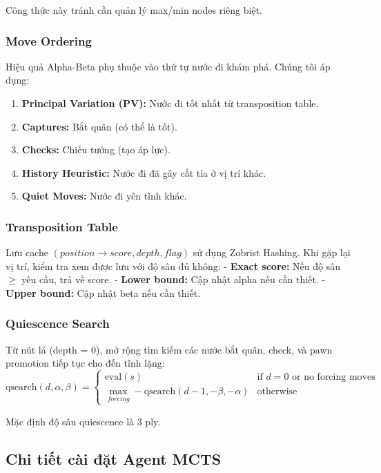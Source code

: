 Công thức này tránh cần quản lý max/min nodes riêng biệt.

\subsubsection{Move Ordering}
Hiệu quả Alpha-Beta phụ thuộc vào thứ tự nước đi khám phá. Chúng tôi áp dụng:
\begin{enumerate}
    \item \textbf{Principal Variation (PV):} Nước đi tốt nhất từ transposition table.
    \item \textbf{Captures:} Bắt quân (có thể là tốt).
    \item \textbf{Checks:} Chiếu tướng (tạo áp lực).
    \item \textbf{History Heuristic:} Nước đi đã gây cắt tỉa ở vị trí khác.
    \item \textbf{Quiet Moves:} Nước đi yên tĩnh khác.
\end{enumerate}

\subsubsection{Transposition Table}
Lưu cache $(position \to score, depth, flag)$ sử dụng Zobrist Hashing. Khi gặp lại vị trí, kiểm tra xem được lưu với độ sâu đủ không:
- \textbf{Exact score:} Nếu độ sâu $\geq$ yêu cầu, trả về score.
- \textbf{Lower bound:} Cập nhật alpha nếu cần thiết.
- \textbf{Upper bound:} Cập nhật beta nếu cần thiết.

\subsubsection{Quiescence Search}
Từ nút lá (depth = 0), mở rộng tìm kiếm các nước bắt quân, check, và pawn promotion tiếp tục cho đến tĩnh lặng:
\begin{equation*}
\text{qsearch}(d, \alpha, \beta) = \begin{cases}
\text{eval}(s) & \text{if } d = 0 \text{ or no forcing moves} \\
\max_{forcing} -\text{qsearch}(d-1, -\beta, -\alpha) & \text{otherwise}
\end{cases}
\end{equation*}

Mặc định độ sâu quiescence là 3 ply.

\subsection{Chi tiết cài đặt Agent MCTS}

